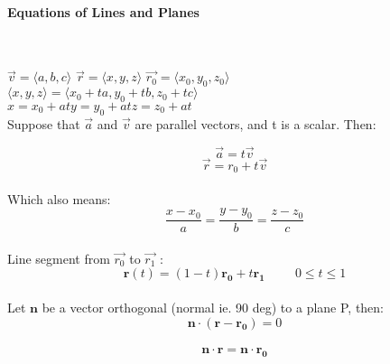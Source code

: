 \documentclass{article}
\begin{document}
\paragraph{Equations of Lines and Planes}\mbox{}\\
\begin{doublespace}
    \(\vec{v} = \langle a,b,c \rangle\)\hspace{1cm}
    \(\vec{r} = \langle x,y,z \rangle\)\hspace{1cm}
    \(\vec{r_0} = \langle x_0,y_0,z_0 \rangle\)\\
    \(\langle x,y,z \rangle = \langle x_0 + ta, y_0 + tb, z_0 + tc \rangle\)\\
    \(x = x_0 + at\)\hspace{1cm}\(y = y_0 + at\)\hspace{1cm}\(z = z_0 + at\)\\
    Suppose that \(\vec{a}\) and \(\vec{v}\) are parallel vectors, and t is a scalar. Then:
\end{doublespace}

\begin{equation}
    \label{some identity}
    \vec{a} = t\vec{v}
\end{equation}
\begin{equation}
    \label{vector equation of L}
    \vec{r} = r_0 + t\vec{v}
\end{equation}\\
Which also means:
\begin{equation}
    \label{parametric equavalents}
    \frac{x - x_0}{a} = \frac{y - y_0}{b} = \frac{z - z_0}{c}
\end{equation}\\

Line segment from \(\vec{r_0}\) to \(\vec{r_1}\) :\\
\begin{equation}
    \mathbf{r}(t) = (1-t)\mathbf{r_0} + t\mathbf{r_1} \hspace{1cm} 0 \leq t \leq 1
\end{equation}\\

Let \(\mathbf{n}\) be a vector orthogonal (normal ie. 90 deg) to a plane P, then:\\
\begin{equation}
    \mathbf{n} \cdot (\mathbf{r - r_0}) = 0
\end{equation}\\
\begin{equation}
    \mathbf{n} \cdot \mathbf{r} = \mathbf{n} \cdot \mathbf{r_0}
\end{equation}\\
\end{document}
